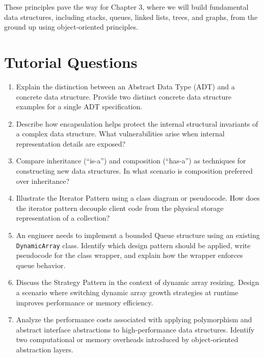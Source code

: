 \documentclass[12pt]{report}
\begin{document}
These principles pave the way for Chapter 3, where we will build fundamental data structures, including stacks, queues, linked lists, trees, and graphs, from the ground up using object-oriented principles.

\section*{Tutorial Questions}

\begin{enumerate}
    \item Explain the distinction between an Abstract Data Type (ADT) and a concrete data structure. Provide two distinct concrete data structure examples for a single ADT specification.
    \item Describe how encapsulation helps protect the internal structural invariants of a complex data structure. What vulnerabilities arise when internal representation details are exposed?
    \item Compare inheritance (``is-a'') and composition (``has-a'') as techniques for constructing new data structures. In what scenario is composition preferred over inheritance?
    \item Illustrate the Iterator Pattern using a class diagram or pseudocode. How does the iterator pattern decouple client code from the physical storage representation of a collection?
    \item An engineer needs to implement a bounded Queue structure using an existing \texttt{DynamicArray} class. Identify which design pattern should be applied, write pseudocode for the class wrapper, and explain how the wrapper enforces queue behavior.
    \item Discuss the Strategy Pattern in the context of dynamic array resizing. Design a scenario where switching dynamic array growth strategies at runtime improves performance or memory efficiency.
    \item Analyze the performance costs associated with applying polymorphism and abstract interface abstractions to high-performance data structures. Identify two computational or memory overheads introduced by object-oriented abstraction layers.
\end{enumerate}
\end{document}
